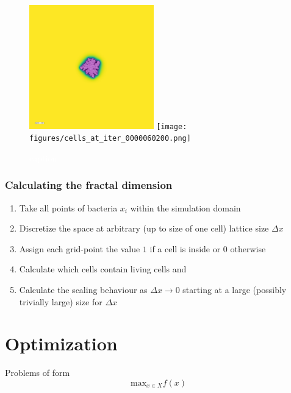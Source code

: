 \documentclass{article}
\newcommand{\todo}[1]{\colorbox{WildStrawberry}{\textcolor{white}{#1}}}
\begin{document}
\begin{figure}[H]
    \centering
    \includegraphics[width=0.48\textwidth]{figures/cells_at_iter_0000009800.png}%
    \hspace{0.04\textwidth}%
    \texttt{[image: figures/cells\_at\_iter\_0000060200.png]}%
    \caption{\todo{caption}}
    \label{fig:bacterial-branching-sim}
\end{figure}

\subsubsection{Calculating the fractal dimension}
\begin{enumerate}
    \item Take all points of bacteria $x_i$ within the simulation domain
    \item Discretize the space at arbitrary (up to size of one cell) lattice size $\Delta x$
    \item Assign each grid-point the value $1$ if a cell is inside or $0$ otherwise
    \item Calculate which cells contain living cells and
    \item Calculate the scaling behaviour as $\Delta x\rightarrow0$ starting at a large (possibly
        trivially large) size for $\Delta x$
\end{enumerate}

\section{Optimization}
\label{section:optimization}

Problems of form
\begin{equation}
    \text{max}_{x\in X} f(x)
\end{equation}
\end{document}
